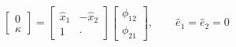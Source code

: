 \begin{equation}\label{eq:sys-Stigum1994}
\left[\begin{array}{c}
    0    \\
  \kappa
\end{array}\right]
=
\left[\begin{array}{cc}
  \hat{x}_1 & -\hat{x}_2 \\
      1     &   \cdot
\end{array}\right]
\left[\begin{array}{c}
  \phi_{12} \\
  \phi_{21}
\end{array}\right]
,\qquad
\hat{e}_1 = \hat{e}_2 = 0
\end{equation}